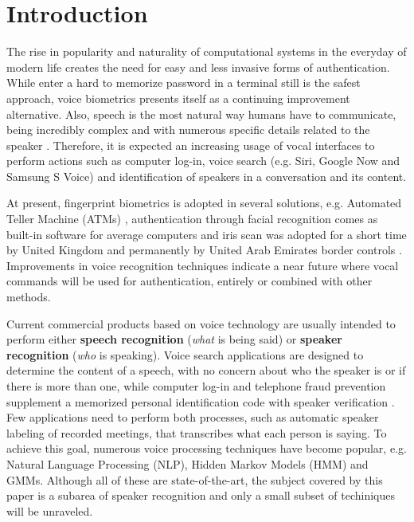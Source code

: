 \chapter{Introduction}

The rise in popularity and naturality of computational systems in the everyday of modern life creates the need for easy and less invasive forms of authentication. While enter a hard to memorize password in a terminal still is the safest approach, voice biometrics presents itself as a continuing improvement alternative. Also, speech is the most natural way humans have to communicate, being incredibly complex and with numerous specific details related to the speaker \autocite{bimbot.et.al.2004}. Therefore, it is expected an increasing usage of vocal interfaces to perform actions such as computer log-in, voice search (e.g. Siri, Google Now and Samsung S Voice) and identification of speakers in a conversation and its content.

At present, fingerprint biometrics is adopted in several solutions, e.g. Automated Teller Machine (ATMs) \autocite{wang.wu.2002}, authentication through facial recognition comes as built-in software for average computers and iris scan was adopted for a short time by United Kingdom and permanently by United Arab Emirates border controls \autocite{sasse.2007, raisi.khouri.2008}. Improvements in voice recognition techniques indicate a near future where vocal commands will be used for authentication, entirely or combined with other methods.

Current commercial products based on voice technology are usually intended to perform either \textbf{speech recognition} (\emph{what} is being said) or \textbf{speaker recognition} (\emph{who} is speaking). Voice search applications are designed to determine the content of a speech, with no concern about who the speaker is or if there is more than one, while computer log-in and telephone fraud prevention supplement a memorized personal identification code with speaker verification \autocite{reynolds.1995}. Few applications need to perform both processes, such as automatic speaker labeling of recorded meetings, that transcribes what each person is saying. To achieve this goal, numerous voice processing techniques have become popular, e.g. Natural Language Processing (NLP), Hidden Markov Models (HMM) and GMMs. Although all of these are state-of-the-art, the subject covered by this paper is a subarea of speaker recognition and only a small subset of techiniques will be unraveled.

